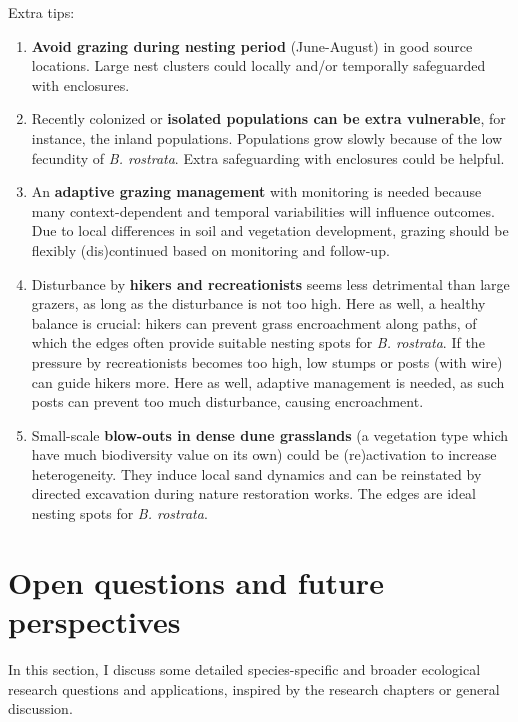 \documentclass[10pt, twoside]{book} %
\begin{document}
\begin{tcolorbox}[box, breakable, boxrule=1pt,toprule at break=1pt,extras={toprule at break=1pt}]
	Extra tips:
	\begin{enumerate}
		\item \textbf{Avoid grazing during nesting period} (June-August) in good source locations. Large nest clusters could locally and/or temporally safeguarded with enclosures.
		
		\item Recently colonized or \textbf{isolated populations can be extra vulnerable}, for instance, the inland populations. Populations grow slowly because of the low fecundity of \textit{B. rostrata}. Extra safeguarding with enclosures could be helpful.
		\item An \textbf{adaptive grazing management} with monitoring is needed because many context-dependent and temporal variabilities will influence outcomes. Due to local differences in soil and vegetation development, grazing should be flexibly (dis)continued based on monitoring and follow-up.
		
		\item Disturbance by \textbf{hikers and recreationists} seems less detrimental than large grazers, as long as the disturbance is not too high. Here as well, a healthy balance is crucial: hikers can prevent grass encroachment along paths, of which the edges often provide suitable nesting spots for \textit{B. rostrata}. If the pressure by recreationists becomes too high, low stumps or posts (with wire) can guide hikers more. Here as well, adaptive management is needed, as such posts can prevent too much disturbance, causing encroachment.
		
		\item Small-scale \textbf{blow-outs in dense dune grasslands} (a vegetation type which have much biodiversity value on its own) could be (re)activation to increase heterogeneity. They induce local sand dynamics and can be reinstated by directed excavation during nature restoration works. The edges are ideal nesting spots for \textit{B. rostrata}.
		
	\end{enumerate}
	
		
	\end{tcolorbox}
\clearpage
	
	\section{Open questions and future perspectives}
	In this section, I discuss some detailed species-specific and broader ecological research questions and applications, inspired by the research chapters or general discussion.\\
	
\end{document}
